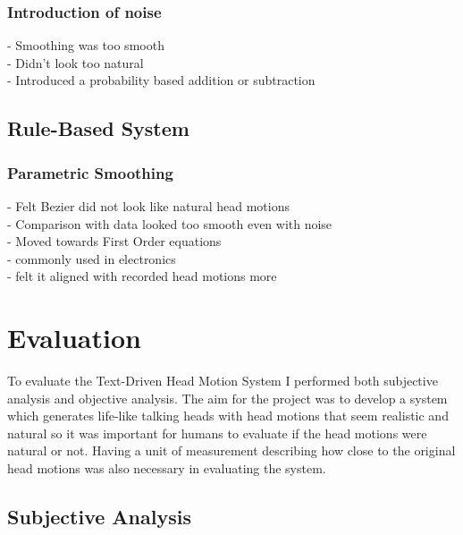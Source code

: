 \documentclass[bsc,frontabs,twoside,singlespacing,parskip]{infthesis}
\begin{document}
\subsection{Introduction of noise}
- Smoothing was too smooth\\
- Didn't look too natural \\
- Introduced a probability based addition or subtraction\\

\section{Rule-Based System}

\subsection{Parametric Smoothing}
- Felt Bezier did not look like natural head motions \\
- Comparison with data looked too smooth even with noise \\
- Moved towards First Order equations \\
- commonly used in electronics \\
- felt it aligned with recorded head motions more\\
	
\chapter{Evaluation}

To evaluate the Text-Driven Head Motion System I performed both subjective analysis and objective analysis. The aim for the project was to develop a system which generates life-like talking heads with head motions that seem realistic and natural so it was important for humans to evaluate if the head motions were natural or not. Having a unit of measurement describing how close to the original head motions was also necessary in evaluating the system.

\section{Subjective Analysis}
\end{document}
